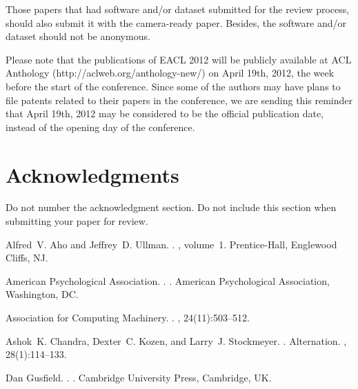 \documentclass[11pt]{article}
\begin{document}
Those papers that had software and/or dataset submitted for the review process, should also submit it 
with the camera-ready paper. Besides, the software and/or dataset should not be anonymous. 

Please note that the publications of EACL 2012 will be publicly available at ACL Anthology 
(http://aclweb.org/anthology-new/) on April 19th, 2012, the week before the start of the conference. 
Since some of the authors may have plans to file patents related to their papers in the conference, 
we are sending this reminder that April 19th, 2012 may be considered to be the official publication date, 
instead of the opening day of the conference.

\section*{Acknowledgments}

Do not number the acknowledgment section. Do not include this section when submitting your paper for review.

\begin{thebibliography}{}

Alfred~V. Aho and Jeffrey~D. Ullman.
.
, volume~1.
\newblock Prentice-{Hall}, Englewood Cliffs, NJ.

{American Psychological Association}.
.
.
\newblock American Psychological Association, Washington, DC.

{Association for Computing Machinery}.
.
, 24(11):503--512.

Ashok~K. Chandra, Dexter~C. Kozen, and Larry~J. Stockmeyer.
.
\newblock Alternation.
,
  28(1):114--133.

Dan Gusfield.
.
.
\newblock Cambridge University Press, Cambridge, UK.

\end{thebibliography}
\end{document}
